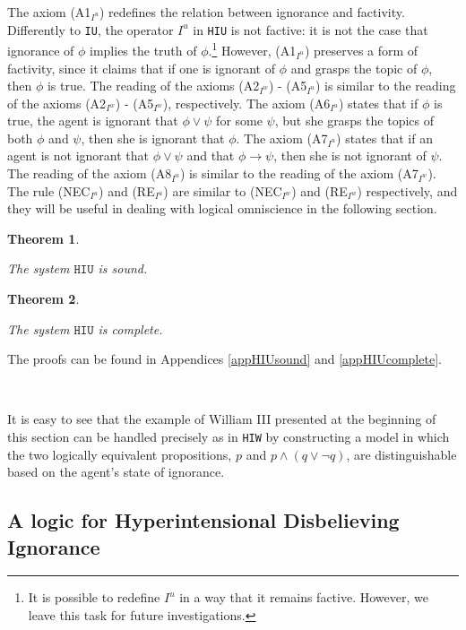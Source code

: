 \documentclass{article}
\newtheorem{theor}{Theorem}
\begin{document}
The axiom (A1$_{I^{u}}$) redefines the relation between ignorance and factivity. Differently to \texttt{IU}, the operator $I^{u}$ in \texttt{HIU} is not factive: it is not the case that ignorance of $\phi$ implies the truth of $\phi$.\footnote{It is possible to redefine $I^{u}$ in a way that it remains factive. However, we leave this task for future investigations.} However,  (A1$_{I^{u}}$) preserves a form of factivity, since it claims that if one is ignorant of $\phi$ and grasps the topic of $\phi$, then $\phi$ is true. The reading of the axioms (A2$_{I^{w}}$) - (A5$_{I^{u}}$) is similar to the reading of the axioms (A2$_{I^{w}}$) - (A5$_{I^{w}}$), respectively. The axiom (A6$_{I^{u}}$) states that if $\phi$ is true, the agent is ignorant that $\phi \vee \psi$ for some $\psi$, but she grasps the topics of both $\phi$ and $\psi$, then she is ignorant that $\phi$. The axiom (A7$_{I^{u}}$) states that if an agent is not ignorant that $\phi \vee \psi$ and that $\phi \rightarrow \psi$, then she is not ignorant of $\psi$. The reading of the axiom (A8$_{I^{u}}$) is similar to the reading of the axiom (A7$_{I^{w}}$). The rule (NEC$_{I^{u}}$)  and (RE$_{I^{u}}$) are similar to (NEC$_{I^{w}}$) and (RE$_{I^{w}}$) respectively, and they will be useful in dealing with logical omniscience in the following section.



\begin{theor}
\label{theorHIUsound}

The system $\mathtt{HIU}$ is sound.

\end{theor}

\begin{theor}
\label{theorHIUcomplete}

The system $\mathtt{HIU}$ is complete.

\end{theor}

The proofs can be found in Appendices \ref{appHIUsound} and \ref{appHIUcomplete}.

\

It is easy to see that the example of William III presented at the beginning of this section can be handled precisely as in \texttt{HIW} by constructing a model in which the two logically equivalent propositions, $p$ and $p \wedge (q \vee \neg q)$, are distinguishable based on the agent's state of ignorance.





\subsection{A logic for Hyperintensional Disbelieving Ignorance}
\end{document}
